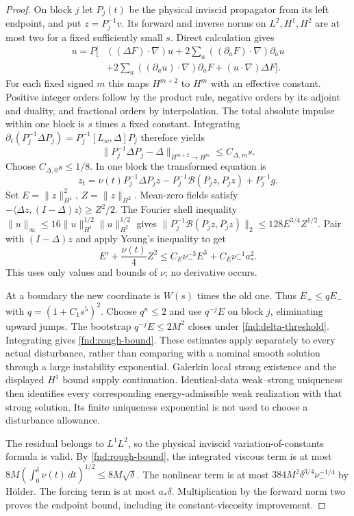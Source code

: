 \documentclass[11pt,a4paper]{amsart}
\theoremstyle{definition}
\theoremstyle{remark}
\numberwithin{equation}{section}
\newcommand{\Bcal}{\mathcal B}
\begin{document}
\begin{proof}
On block $j$ let $P_j(t)$ be the physical inviscid propagator from its left
endpoint, and put $z=P_j^{-1}v$. Its forward and inverse norms on $L^2,H^1,H^2$
are at most two for a fixed sufficiently small $s$. Direct calculation gives
\begin{align*}
 [\Delta,L_F]u=P\bigl[&((\Delta F)\cdot\nabla)u
 +2\sum_a((\partial_aF)\cdot\nabla)\partial_a u\\
 &+2\sum_a((\partial_a u)\cdot\nabla)\partial_aF
 +(u\cdot\nabla)\Delta F\bigr].
\end{align*}
For each fixed signed $m$ this maps $H^{m+2}$ to $H^m$ with an effective
constant. Positive integer orders follow by the product rule, negative orders
by its adjoint and duality, and fractional orders by interpolation.
The total absolute impulse within one block is $s$ times a fixed constant.
Integrating
$\partial_t(P_j^{-1}\Delta P_j)=P_j^{-1}[L_w,\Delta]P_j$ therefore yields
\begin{equation}
 \|P_j^{-1}\Delta P_j-\Delta\|_{H^{m+2}\to H^m}\le C_{\Delta,m}s.
 \label{fnd:laplace-commutator}
\end{equation}
Choose $C_{\Delta,0}s\le1/8$. In one block the transformed equation is
\[
 z_t=\nu(t)P_j^{-1}\Delta P_jz
       -P_j^{-1}\Bcal(P_jz,P_jz)+P_j^{-1}g.
\]
Set $E=\|z\|_{H^1}^2$, $Z=\|z\|_{H^2}$. Mean-zero fields satisfy
$-\langle\Delta z,(I-\Delta)z\rangle\ge Z^2/2$. The Fourier shell inequality
$\|u\|_\infty\le16\|u\|_{H^1}^{1/2}\|u\|_{H^2}^{1/2}$ gives
$\|P_j^{-1}\Bcal(P_jz,P_jz)\|_2\le128E^{3/4}Z^{1/2}$.
Pair with $(I-\Delta)z$ and apply Young's inequality to get
\begin{equation}
 E'+\frac{\nu(t)}4Z^2
 \le C_E\nu_-^{-3}E^3+C_E\nu_-^{-1}a_*^2.
 \label{fnd:block-energy}
\end{equation}
This uses only values and bounds of $\nu$; no derivative occurs.

At a boundary the new coordinate is $W(s)$ times the old one. Thus
$E_+\le qE_-$ with $q=(1+C_1s^5)^2$. Choose $q^n\le2$ and use $q^{-j}E$
on block $j$, eliminating upward jumps. The bootstrap $q^{-j}E\le2M^2$ closes
under \eqref{fnd:delta-threshold}. Integrating gives
\eqref{fnd:rough-bound}. These estimates apply separately to every actual
disturbance, rather than comparing with a nominal smooth solution through a
large instability exponential. Galerkin local strong existence and the
displayed $H^1$ bound supply continuation. Identical-data weak--strong
uniqueness then identifies every corresponding energy-admissible weak
realization with that strong solution. Its finite uniqueness exponential is
not used to choose a disturbance allowance.

The residual belongs to $L^1L^2$, so the physical inviscid variation-of-constants
formula is valid. By \eqref{fnd:rough-bound}, the integrated viscous term is at
most $8M(\int_0^\delta\nu(t)\,dt)^{1/2}\le8M\sqrt\delta$. The nonlinear term
is at most $384M^2\delta^{3/4}\nu_-^{-1/4}$ by H\"older. The forcing term is
at most $a_*\delta$. Multiplication by the forward norm two proves the endpoint
bound, including its constant-viscosity improvement.
\end{proof}
\end{document}
